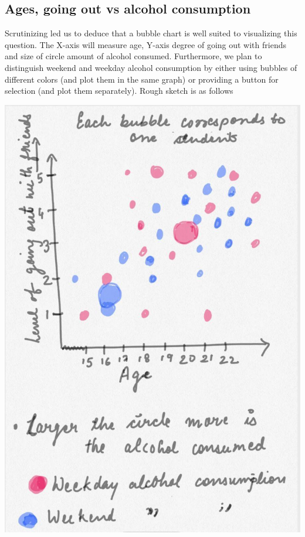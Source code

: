 \documentclass[titlepage, 12pt]{article}
\begin{document}
\subsection{Ages, going out vs alcohol consumption}
Scrutinizing led us to deduce that a bubble chart is well suited to visualizing
this question. The X-axis will measure age, Y-axis degree of going out with
friends and size of circle amount of alcohol consumed. Furthermore, we plan to
distinguish weekend and weekday alcohol consumption by either using bubbles of
different colors (and plot them in the same graph) or providing a button for
selection (and plot them separately). Rough sketch is as follows

\begin{center}
\includegraphics[scale=0.3]{4}
\end{center}
\end{document}
